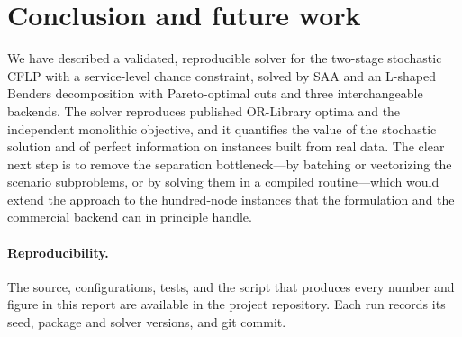 \documentclass[11pt]{article}
\begin{document}
\section{Conclusion and future work}
\label{sec:conclusion}

We have described a validated, reproducible solver for the two-stage stochastic
CFLP with a service-level chance constraint, solved by SAA and an L-shaped Benders
decomposition with Pareto-optimal cuts and three interchangeable backends. The
solver reproduces published OR-Library optima and the independent monolithic
objective, and it quantifies the value of the stochastic solution and of perfect
information on instances built from real data. The clear next step is to remove the
separation bottleneck---by batching or vectorizing the scenario subproblems, or by
solving them in a compiled routine---which would extend the approach to the
hundred-node instances that the formulation and the commercial backend can in
principle handle.

\paragraph{Reproducibility.}
The source, configurations, tests, and the script that produces every number and
figure in this report are available in the project repository. Each run records its
seed, package and solver versions, and git commit.



\end{document}
